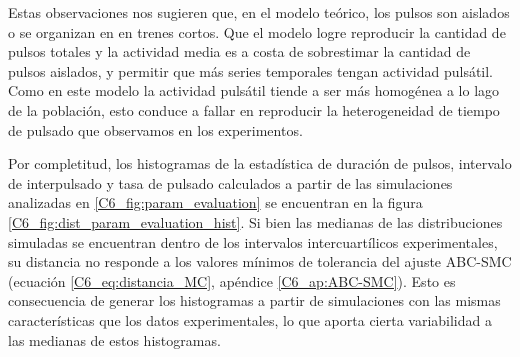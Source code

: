 \documentclass[./main.tex]{subfiles}
\begin{document}
Estas observaciones nos sugieren que, en el modelo teórico, los pulsos son aislados o se organizan en en trenes cortos. Que el modelo logre reproducir la cantidad de pulsos totales y la actividad media es a costa de sobrestimar la cantidad de pulsos aislados, y permitir que más series temporales tengan actividad pulsátil. Como en este modelo la actividad pulsátil tiende a ser más homogénea a lo lago de la población, esto conduce a fallar en reproducir la heterogeneidad de tiempo de pulsado que observamos en los experimentos. 


Por completitud, los histogramas de la estadística de duración de pulsos, intervalo de interpulsado y tasa de pulsado calculados a partir de las simulaciones analizadas en \ref{C6_fig:param_evaluation} se encuentran en la figura \ref{C6_fig:dist_param_evaluation_hist}. Si bien las medianas de las distribuciones simuladas se encuentran dentro de los intervalos intercuartílicos experimentales, su distancia no responde a los valores mínimos de tolerancia del ajuste ABC-SMC (ecuación \ref{C6_eq:distancia_MC}, apéndice \ref{C6_ap:ABC-SMC}). Esto es consecuencia de generar los histogramas a partir de simulaciones con las mismas características que los datos experimentales, lo que aporta cierta variabilidad a las medianas de estos histogramas. 
\end{document}
